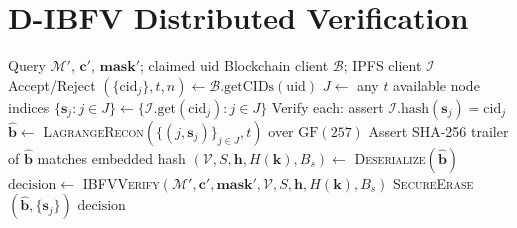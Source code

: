 \section{D-IBFV Distributed Verification}

\begin{algorithm}[H]
\caption{D-IBFV Distributed Verification}
\label{alg:dibfv_verify}
\begin{algorithmic}[1]
\Require Query $\mathcal{M}'$, $\mathbf{c}'$, $\mathbf{mask}'$; claimed $\mathrm{uid}$
\Require Blockchain client $\mathcal{B}$; IPFS client $\mathcal{I}$
\Ensure Accept/Reject
\State $(\{\mathrm{cid}_j\}, t, n) \leftarrow \mathcal{B}.\mathrm{getCIDs}(\mathrm{uid})$
\State $J \leftarrow$ any $t$ available node indices
\State $\{\mathbf{s}_j : j \in J\} \leftarrow \{\mathcal{I}.\mathrm{get}(\mathrm{cid}_j) : j \in J\}$
\State Verify each: assert $\mathcal{I}.\mathrm{hash}(\mathbf{s}_j) = \mathrm{cid}_j$
\State $\hat{\mathbf{b}} \leftarrow$ \textsc{LagrangeRecon}$(\{(j, \mathbf{s}_j)\}_{j \in J}, t)$ over $\mathrm{GF}(257)$
\State Assert SHA-256 trailer of $\hat{\mathbf{b}}$ matches embedded hash
\State $(\mathcal{V}, S, \mathbf{h}, H(\mathbf{k}), B_s) \leftarrow$ \textsc{Deserialize}$(\hat{\mathbf{b}})$
\State $\mathrm{decision} \leftarrow$ \textsc{IBFVVerify}$(\mathcal{M}', \mathbf{c}', \mathbf{mask}',
  \mathcal{V}, S, \mathbf{h}, H(\mathbf{k}), B_s)$ 
\State \textsc{SecureErase}$(\hat{\mathbf{b}}, \{\mathbf{s}_j\})$
\State \Return $\mathrm{decision}$
\end{algorithmic}
\end{algorithm}
